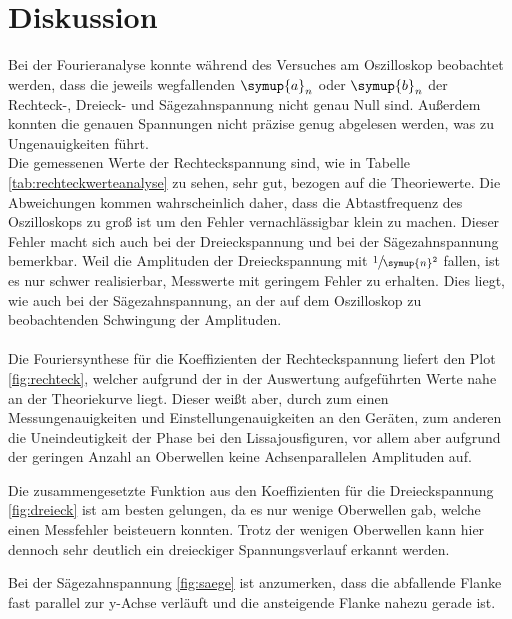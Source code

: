 \section{Diskussion}
\label{sec:Diskussion}
Bei der Fourieranalyse konnte während des Versuches am
Oszilloskop beobachtet werden, dass die jeweils wegfallenden $\symup{a}_n$ oder
$\symup{b}_n$ der Rechteck-, Dreieck- und Sägezahnspannung nicht genau Null
sind. Außerdem konnten die genauen Spannungen nicht präzise genug abgelesen
werden, was zu Ungenauigkeiten führt. \\
Die gemessenen Werte der Rechteckspannung sind, wie in Tabelle
\eqref{tab:rechteckwerteanalyse} zu sehen, sehr gut, bezogen auf die
Theoriewerte.
Die Abweichungen kommen wahrscheinlich daher, dass die Abtastfrequenz des
Oszilloskops zu groß ist um den Fehler vernachlässigbar klein zu machen.
Dieser Fehler macht sich auch bei der Dreieckspannung und bei der
Sägezahnspannung bemerkbar.
Weil die Amplituden der Dreieckspannung mit $\sfrac{1}{\symup{n}^2}$ fallen,
ist es nur schwer realisierbar, Messwerte mit geringem Fehler zu erhalten.
Dies liegt, wie auch bei der Sägezahnspannung, an der auf dem Oszilloskop zu
beobachtenden Schwingung der Amplituden.
\\
\\
Die Fouriersynthese für die Koeffizienten der Rechteckspannung liefert
den Plot \ref{fig:rechteck}, welcher aufgrund der in der Auswertung
aufgeführten Werte nahe an der Theoriekurve liegt. Dieser weißt aber, durch
zum einen Messungenauigkeiten und Einstellungenauigkeiten an den Geräten,
zum anderen die Uneindeutigkeit der Phase bei den Lissajousfiguren,
vor allem aber aufgrund der geringen Anzahl an Oberwellen keine
Achsenparallelen Amplituden auf.

Die zusammengesetzte Funktion aus den Koeffizienten für die Dreieckspannung
\ref{fig:dreieck} ist am besten gelungen, da es nur wenige Oberwellen gab,
welche einen Messfehler beisteuern konnten. Trotz der wenigen Oberwellen kann
hier dennoch sehr deutlich ein dreieckiger Spannungsverlauf erkannt werden.

Bei der Sägezahnspannung \ref{fig:saege} ist anzumerken, dass die abfallende
Flanke fast parallel zur y-Achse verläuft und die ansteigende Flanke nahezu
gerade ist.
